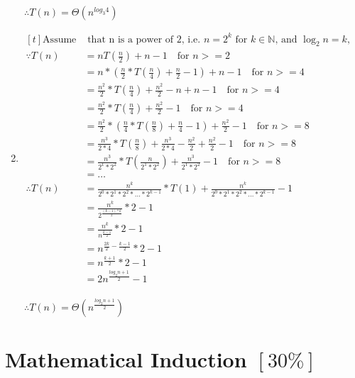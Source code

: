 \documentclass{article}
\begin{document}
\begin{enumerate}[label=(\alph*)]
$\ \therefore T(n) = \Theta(n^{log_3 4})$

\item $\begin{aligned}[t]
\text{Assume} & \text{ that n is a power of 2, i.e. $n=2^k$ for $k \in \mathbb{N}$, and $\log_2 n = k$,}\\
\because T(n) &= nT(\frac{n}{2})+n-1 \quad \text{for $n>=2$}\\
&= n*(\frac{n}{2}*T(\frac{n}{4}) + \frac{n}{2} - 1) + n - 1 \quad \text{for $n>=4$}\\
&= \frac{n^2}{2}*T(\frac{n}{4}) + \frac{n^2}{2} - n + n - 1 \quad \text{for $n>=4$}\\
&= \frac{n^2}{2}*T(\frac{n}{4}) + \frac{n^2}{2} - 1 \quad \text{for $n>=4$}\\
&= \frac{n^2}{2}*(\frac{n}{4}*T(\frac{n}{8}) + \frac{n}{4} - 1) + \frac{n^2}{2} - 1 \quad \text{for $n>=8$}\\
&= \frac{n^3}{2*4}*T(\frac{n}{8})+\frac{n^3}{2*4} - \frac{n^2}{2} + \frac{n^2}{2} - 1 \quad \text{for $n>=8$}\\
&= \frac{n^3}{2^1*2^2}*T(\frac{n}{2^1*2^2})+\frac{n^3}{2^1*2^2} - 1 \quad \text{for $n>=8$}\\
&= \dots\\
\therefore T(n) &= \frac{n^k}{2^0*2^1*2^2*...*2^{k-1}}*T(1) + \frac{n^k}{2^0*2^1*2^2*...*2^{k-1}} - 1\\
&= \frac{n^k}{2^{\frac{(k-1)*k}{2}}}*2-1\\
&= \frac{n^k}{n^{\frac{k-1}{2}}}*2-1\\
&= n^{\frac{2k}{2}-\frac{k-1}{2}}*2-1\\
&= n^{\frac{k+1}{2}}*2-1\\
&= 2n^{\frac{log_2 n +1}{2}}-1\\
\end{aligned}$

$\ \therefore T(n) = \Theta(n^{\frac{log_2 n+1}{2}})$

\end{enumerate}

\section{Mathematical Induction $[30\%]$}
\end{document}
